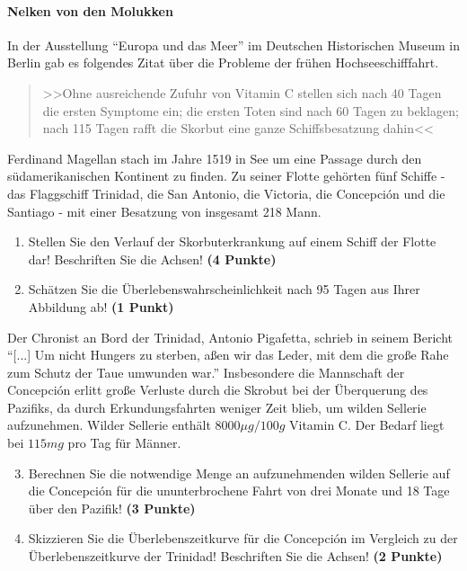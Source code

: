 \documentclass[a4paper, 10pt]{scrartcl}\usepackage[]{graphicx}\usepackage[]{xcolor}
\begin{document}
\paragraph{Nelken von den Molukken}



In der Ausstellung "`Europa und das Meer"' im Deutschen Historischen Museum in
Berlin gab es folgendes Zitat {\"u}ber die Probleme der fr{\"u}hen Hochseeschifffahrt.

\begin{quote}
  >>Ohne ausreichende Zufuhr von Vitamin C stellen sich nach 40 Tagen die
  ersten Symptome ein; die ersten Toten sind nach 60 Tagen zu beklagen;
  nach 115 Tagen rafft die Skorbut eine ganze Schiffsbesatzung dahin<<
\end{quote}

Ferdinand Magellan stach im Jahre 1519 in See um eine Passage durch den
s{\"u}damerikanischen Kontinent zu finden. Zu seiner Flotte geh{\"o}rten
f{\"u}nf Schiffe - das Flaggschiff Trinidad, die San Antonio, die Victoria, die
Concepci{\'o}n und die Santiago - mit einer Besatzung von insgesamt
218 Mann. 

\begin{enumerate}
\item Stellen Sie den Verlauf der Skorbuterkrankung auf einem Schiff der
  Flotte dar! Beschriften Sie die Achsen! \textbf{(4 Punkte)} 
\item Sch{\"a}tzen Sie die {\"U}berlebenswahrscheinlichkeit nach 95 Tagen
  aus Ihrer Abbildung ab! \textbf{(1 Punkt)} 
\end{enumerate}


Der Chronist an Bord der Trinidad, Antonio Pigafetta, schrieb in seinem
Bericht "`[...] Um nicht Hungers zu sterben, a{\ss}en wir das Leder, mit dem
die gro{\ss}e Rahe zum Schutz der Taue umwunden war."' Insbesondere die
Mannschaft der Concepci{\'o}n erlitt gro{\ss}e Verluste durch die Skrobut bei der
{\"U}berquerung des Pazifiks, da durch Erkundungsfahrten weniger Zeit blieb, um
wilden Sellerie aufzunehmen. Wilder Sellerie enth{\"a}lt
$8000\mu g/100g$ Vitamin C. Der Bedarf liegt bei
$115mg$ pro Tag f{\"u}r M{\"a}nner.

\begin{enumerate}
  \setcounter{enumi}{2}
\item Berechnen Sie die notwendige Menge an aufzunehmenden wilden Sellerie
  auf die Concepci{\'o}n f{\"u}r die ununterbrochene Fahrt von drei Monate und 18
  Tage {\"u}ber den Pazifik! \textbf{(3 Punkte)}
\item Skizzieren Sie die {\"U}berlebenszeitkurve f{\"u}r die Concepci{\'o}n im
  Vergleich zu der {\"U}berlebenszeitkurve der Trinidad! Beschriften Sie die
  Achsen! \textbf{(2 Punkte)}
\end{enumerate}
\end{document}
